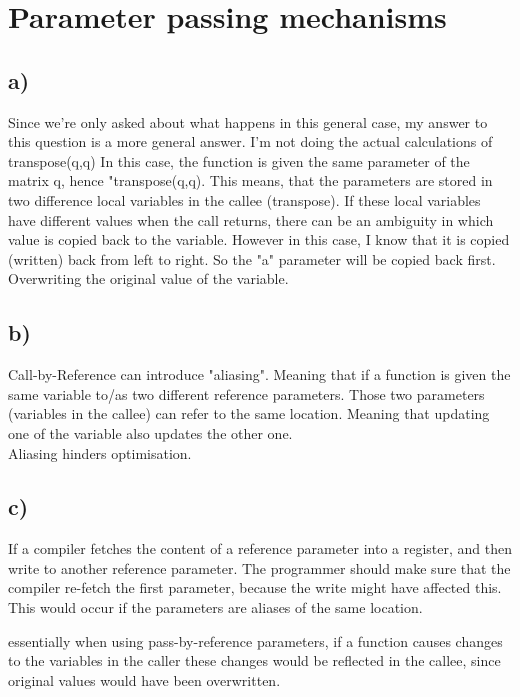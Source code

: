 \section{Parameter passing mechanisms}
\subsection{a)}
Since we're only asked about what happens in this general case, my answer to this
question is a more general answer. I'm not doing the actual calculations of transpose(q,q)
In this case, the function is given the same parameter of the matrix q, hence "transpose(q,q).
This means, that the parameters are stored in two difference local variables in the callee (transpose).
If these local variables have different values when the call returns, there can be an ambiguity in which value is copied back to the variable.
However in this case, I know that it is copied (written) back from left to right.
So the "a" parameter will be copied back first. Overwriting the original value of the variable.

\subsection{b)}
Call-by-Reference can introduce "aliasing". Meaning that if a function is given the same variable to/as two different reference parameters.
Those two parameters (variables in the callee) can refer to the same location. Meaning that updating one of the variable also updates the other one.
\\
Aliasing hinders optimisation.

\subsection{c)}
If a compiler fetches the content of a reference parameter into a register, and then write to another reference parameter. 
The programmer should make sure that the compiler re-fetch the first parameter, because the write might have affected this.
This would occur if the parameters are aliases of the same location.

essentially when using pass-by-reference parameters, if a function causes changes to the variables in the caller
these changes would be reflected in the callee, since original values would have been overwritten.


\newpage